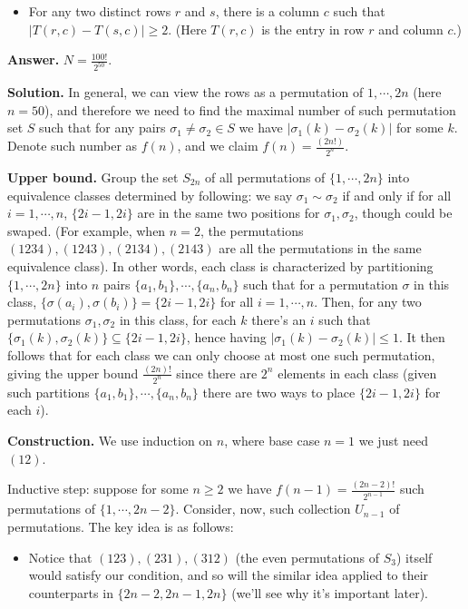 \documentclass[11pt,a4paper]{article}
\begin{document}
\begin{enumerate}
\begin{itemize}
	    	\item For any two distinct rows $r$ and $s$, there is a column $c$ such that $|T(r,c) - T(s, c)|\geq 2$. (Here $T(r,c)$ is the entry in row $r$ and column $c$.)
	    \end{itemize}
        
        \textbf{Answer.} $N = \frac{100!}{2^{50}}$. 
        
        \textbf{Solution.} 
        In general, we can view the rows as a permutation of $1, \cdots, 2n$ (here $n=50$), 
        and therefore we need to find the maximal number of such permutation set $S$ such that for any pairs $\sigma_1\neq \sigma_2\in S$ we have $|\sigma_1(k)-\sigma_2(k)|$ for some $k$. 
        Denote such number as $f(n)$, and we claim $f(n)=\frac{(2n!)}{2^n}$. 
        
        \textbf{Upper bound.} 
        Group the set $S_{2n}$ of all permutations of $\{1, \cdots, 2n\}$ into equivalence classes determined by following: we say $\sigma_1\sim \sigma_2$ if and only if for all $i=1, \cdots, n$, $\{2i-1, 2i\}$ are in the same two positions for $\sigma_1, \sigma_2$, though could be swaped. 
        (For example, when $n=2$, the permutations $(1234), (1243), (2134), (2143)$ are all the permutations in the same equivalence class). 
        In other words, each class is characterized by partitioning $\{1, \cdots, 2n\}$ into $n$ pairs 
        $\{a_1, b_1\}, \cdots, \{a_n, b_n\}$ such that for a permutation $\sigma$ in this class, 
        $\{\sigma(a_i), \sigma(b_i)\}=\{2i-1, 2i\}$ for all $i=1, \cdots, n$. 
        Then, for any two permutations $\sigma_1, \sigma_2$ in this class, for each $k$ there's an $i$ such that $\{\sigma_1(k), \sigma_2(k)\}\subseteq \{2i-1, 2i\}$, 
        hence having $|\sigma_1(k) -\sigma_2(k)|\le 1$. 
        It then follows that for each class we can only choose at most one such permutation, giving the upper bound 
        $\frac{(2n)!}{2^{n}}$ since there are $2^n$ elements in each class 
        (given such partitions $\{a_1, b_1\}, \cdots, \{a_n, b_n\}$ there are two ways to place $\{2i-1, 2i\}$ for each $i$). 
        
        \textbf{Construction.} 
        We use induction on $n$, where base case $n=1$ we just need $(12)$. 
        
        Inductive step: suppose for some $n\ge 2$ we have $f(n-1)=\frac{(2n-2)!}{2^{n-1}}$ such permutations of $\{1, \cdots, 2n-2\}$. Consider, now, such collection $U_{n-1}$ of permutations. 
        The key idea is as follows: 
        \begin{itemize}
        	\item Notice that $(123), (231), (312)$ (the even permutations of $S_3$) itself would satisfy our condition, and so will the similar idea applied to their counterparts in $\{2n-2, 2n-1, 2n\}$ (we'll see why it's important later). 
        	

\end{itemize}
\end{enumerate}
\end{document}
